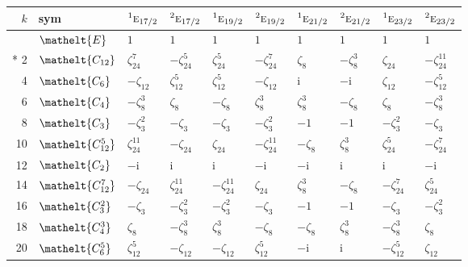 \documentclass[10pt,a4paper]{article}
\numberwithin{equation}{section}
\newcommand{\eltfont}[1]{{\let\sigma\eltsigma\mathelt{#1}}}
\newcommand{\irr}[1]{\text{\normalfont\scshape #1}}
\newcommand{\conjpair}[1]{{}^{#1}}
\newcommand{\cls}[1]{\eltfont{#1}}
\newcommand{\iunit}{\mathrm{i}}
\newcommand{\rootunity}[1]{\zeta_{#1}}
\begin{document}
{\small\setlength{\tabcolsep}{4pt}
\begin{longtable}{@{}rlllllllll@{}}\toprule
$k$ & sym & $\conjpair{1}\irr{e}_{17/2}$ & $\conjpair{2}\irr{e}_{17/2}$ & $\conjpair{1}\irr{e}_{19/2}$ & $\conjpair{2}\irr{e}_{19/2}$ & $\conjpair{1}\irr{e}_{21/2}$ & $\conjpair{2}\irr{e}_{21/2}$ & $\conjpair{1}\irr{e}_{23/2}$ & $\conjpair{2}\irr{e}_{23/2}$\\\midrule\endhead
\bottomrule\endfoot\endlastfoot
0 & $\cls{E}$ & $1$ & $1$ & $1$ & $1$ & $1$ & $1$ & $1$ & $1$\\*
2 & $\cls{C_{12}}$ & $\rootunity{24}^{7}$ & $-\rootunity{24}^{5}$ & $\rootunity{24}^{5}$ & $-\rootunity{24}^{7}$ & $\rootunity{8}$ & $-\rootunity{8}^{3}$ & $\rootunity{24}$ & $-\rootunity{24}^{11}$\\
4 & $\cls{C_{6}}$ & $-\rootunity{12}$ & $\rootunity{12}^{5}$ & $\rootunity{12}^{5}$ & $-\rootunity{12}$ & $\iunit{}$ & $-\iunit{}$ & $\rootunity{12}$ & $-\rootunity{12}^{5}$\\
6 & $\cls{C_{4}}$ & $-\rootunity{8}^{3}$ & $\rootunity{8}$ & $-\rootunity{8}$ & $\rootunity{8}^{3}$ & $\rootunity{8}^{3}$ & $-\rootunity{8}$ & $\rootunity{8}$ & $-\rootunity{8}^{3}$\\
8 & $\cls{C_{3}}$ & $-\rootunity{3}^{2}$ & $-\rootunity{3}$ & $-\rootunity{3}$ & $-\rootunity{3}^{2}$ & $-1$ & $-1$ & $-\rootunity{3}^{2}$ & $-\rootunity{3}$\\
10 & $\cls{C_{12}^{5}}$ & $\rootunity{24}^{11}$ & $-\rootunity{24}$ & $\rootunity{24}$ & $-\rootunity{24}^{11}$ & $-\rootunity{8}$ & $\rootunity{8}^{3}$ & $\rootunity{24}^{5}$ & $-\rootunity{24}^{7}$\\
12 & $\cls{C_{2}}$ & $-\iunit{}$ & $\iunit{}$ & $\iunit{}$ & $-\iunit{}$ & $-\iunit{}$ & $\iunit{}$ & $\iunit{}$ & $-\iunit{}$\\
14 & $\cls{C_{12}^{7}}$ & $-\rootunity{24}$ & $\rootunity{24}^{11}$ & $-\rootunity{24}^{11}$ & $\rootunity{24}$ & $\rootunity{8}^{3}$ & $-\rootunity{8}$ & $-\rootunity{24}^{7}$ & $\rootunity{24}^{5}$\\
16 & $\cls{C_{3}^{2}}$ & $-\rootunity{3}$ & $-\rootunity{3}^{2}$ & $-\rootunity{3}^{2}$ & $-\rootunity{3}$ & $-1$ & $-1$ & $-\rootunity{3}$ & $-\rootunity{3}^{2}$\\
18 & $\cls{C_{4}^{3}}$ & $\rootunity{8}$ & $-\rootunity{8}^{3}$ & $\rootunity{8}^{3}$ & $-\rootunity{8}$ & $-\rootunity{8}$ & $\rootunity{8}^{3}$ & $-\rootunity{8}^{3}$ & $\rootunity{8}$\\
20 & $\cls{C_{6}^{5}}$ & $\rootunity{12}^{5}$ & $-\rootunity{12}$ & $-\rootunity{12}$ & $\rootunity{12}^{5}$ & $-\iunit{}$ & $\iunit{}$ & $-\rootunity{12}^{5}$ & $\rootunity{12}$\\

\end{longtable}}
\end{document}
